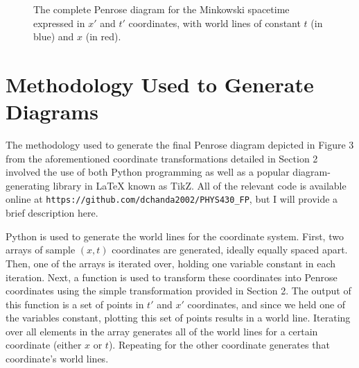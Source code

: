 \documentclass{article}
\def\R{0.25} %
\def\e{0.25} %
\def\ang{45} %
\def\angb{acos(sqrt(\e)*sin(\ang))} %
\def\a{\R*sin(\ang)*sqrt(1-\e*sin(\ang)^2)/(1-\e*sin(\ang)^2)} %
\def\b{\R*sqrt(\e)*sin(\ang)*cos(\ang)/(1-\e*sin(\ang)^2)} %
\def\conefront#1{ %
  \draw[cone] %
    (#1) --++ (45:\R) arc({\angb-90}:{-90-\angb}:{\a} and {\b})
     --++ (-45:2*\R) arc({90-\angb}:{-270+\angb}:{\a} and {\b}) -- cycle;
}
\begin{document}
\begin{figure}[ht]
\begin{center}
\end{center}


\caption{The complete Penrose diagram for the Minkowski spacetime expressed in $x'$ and $t'$ coordinates, with world lines of constant $t$ (in blue) and $x$ (in red).}
\label{fig:penrose_mink}
\end{figure}

\section{Methodology Used to Generate Diagrams}

The methodology used to generate the final Penrose diagram depicted in Figure 3 from the aforementioned coordinate transformations detailed in Section 2 involved the use of both Python programming as well as a popular diagram-generating library in LaTeX known as TikZ. All of the relevant code is available online at \texttt{https://github.com/dchanda2002/PHYS430_FP}, but I will provide a brief description here.

Python is used to generate the world lines for the coordinate system. First, two arrays of sample $(x,t)$ coordinates are generated, ideally equally spaced apart. Then, one of the arrays is iterated over, holding one variable constant in each iteration. Next, a function is used to transform these coordinates into Penrose coordinates using the simple transformation provided in Section 2. The output of this function is a set of points in $t'$ and $x'$ coordinates, and since we held one of the variables constant, plotting this set of points results in a world line. Iterating over all elements in the array generates all of the world lines for a certain coordinate (either $x$ or $t$). Repeating for the other coordinate generates that coordinate's world lines.
\end{document}

